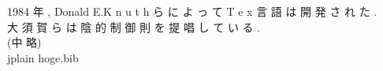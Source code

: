 \documentclass[dvipdfmx,uplatex]{jsarticle}
\begin{document}
1984 年 , Donald E.K n u t h ら に よ っ て T e x 言 語 は 開 発 さ れ た \cite{Kunth84literateprogramming}. \\
大 須 賀 ら \cite{osuka_2010_ImplicitControl} は 陰 的 制 御 則 を 提 唱 し て い る . \\
\cite{osuka2000}
(中 略)\\

 {jplain}
 {hoge.bib}
\end{document}
